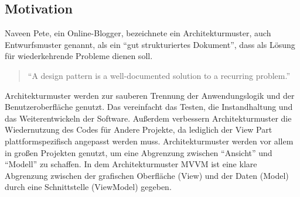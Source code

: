 \subsection{Motivation}
Naveen Pete, ein Online-Blogger, bezeichnete ein Architekturmuster, auch Entwurfsmuster genannt, als ein \enquote{gut strukturiertes Dokument}, dass als L\"osung f\"ur wiederkehrende Probleme dienen soll\cite{Pete2016}.
\begin{quotation}
\enquote{A design pattern is a well-documented solution to a recurring problem.}
\end{quotation}
Architekturmuster werden zur sauberen Trennung der Anwendungslogik und der Benutzeroberfl\"ache genutzt. Das vereinfacht das Testen, die Instandhaltung und das Weiterentwickeln der Software. Au\ss{}erdem verbessern Architekturmuster die Wiedernutzung des Codes f\"ur Andere Projekte, da lediglich der View Part plattformspezifisch angepasst werden muss\cite{MicrosoftMVVM2012}.
Architekturmuster werden vor allem in gro\ss{}en Projekten genutzt, um eine Abgrenzung zwischen \enquote{Ansicht} und \enquote{Modell} zu schaffen. In dem Architekturmuster \ac{MVVM} ist eine klare Abgrenzung zwischen der grafischen Oberfl\"ache (View) und der Daten (Model) durch eine Schnittstelle (ViewModel) gegeben.


